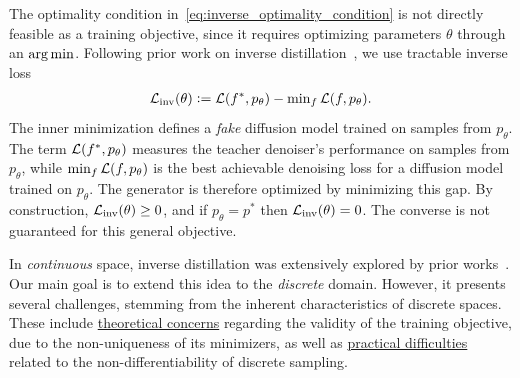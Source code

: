     The optimality condition in~\eqref{eq:inverse_optimality_condition} is not directly feasible as a training objective, since it requires optimizing parameters $\theta$ through an $\operatorname*{arg\,min}$. Following prior work on inverse distillation~\citep{gushchin2025inverse,kornilov2025universal, selikhanovych2025one}, we use tractable inverse loss
    \begin{gather}
    \begin{aligned}
    \mathcal{L}_{\text{inv}}(\theta)
    \vcentcolon=
        \mathcal{L}(f^*, p_{\theta})-
        \min\nolimits_{f} \mathcal{L}(f, p_{\theta}).
    \end{aligned}
    \label{eq:inverse optimization problem}
    \end{gather}
    The inner minimization defines a \emph{fake} diffusion model trained on samples from $p_\theta$. The term $\mathcal{L}(f^*,p_\theta)$ measures the teacher denoiser's performance on samples from $p_\theta$, while $\min_f \mathcal{L}(f,p_\theta)$ is the best achievable denoising loss for a diffusion model trained on $p_\theta$. The generator is therefore optimized by minimizing this gap. By construction, $\mathcal{L}_{\text{inv}}(\theta)\geq0$, and if $p_\theta=p^*$ then $\mathcal{L}_{\text{inv}}(\theta)=0$. The converse is not guaranteed for this general objective.

    In \emph{continuous} space, inverse distillation was extensively explored by prior works~\citep{gushchin2025inverse,kornilov2025universal, selikhanovych2025one}. Our main goal is to extend this idea to the \emph{discrete} domain. However, it presents several challenges, stemming from the inherent characteristics of discrete spaces. These include \underline{theoretical concerns} regarding the validity of the training objective, due to the non-uniqueness of its minimizers, as well as \underline{practical difficulties} related to the non-differentiability of discrete sampling.
